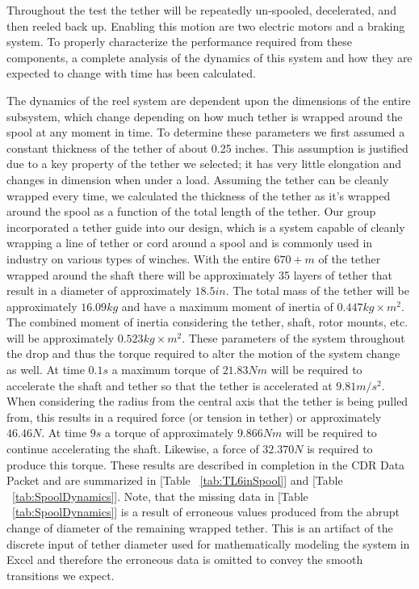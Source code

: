 \indent\indent Throughout the test the tether will be repeatedly un-spooled, decelerated, and then reeled back up. Enabling this motion are two electric motors and a braking system. To properly characterize the performance required from these components, a complete analysis of the dynamics of this system and how they are expected to change with time has been calculated. 

\indent\indent The dynamics of the reel system are dependent upon the dimensions of the entire subsystem, which change depending on how much tether is wrapped around the spool at any moment in time. To determine these parameters we first assumed a constant thickness of the tether of about 0.25 inches. This assumption is justified due to a key property of the tether we selected; it has very little elongation and changes in dimension when under a load. Assuming the tether can be cleanly wrapped every time, we calculated the thickness of the tether as it's wrapped around the spool as a function of the total length of the tether. Our group incorporated a tether guide into our design, which is a system capable of cleanly wrapping a line of tether or cord around a spool and is commonly used in industry on various types of winches. With the entire $670+ m$ of the tether wrapped around the shaft there will be approximately 35 layers of tether that result in a diameter of approximately $18.5 in$. The total mass of the tether will be approximately $16.09 kg$ and have a maximum moment of inertia of $0.447 kg\times m^2$. The combined moment of inertia considering the tether, shaft, rotor mounts, etc. will be approximately $0.523 kg\times m^2$. These parameters of the system throughout the drop and thus the torque required to alter the motion of the system change as well. At time $0.1 s$ a maximum torque of $21.83 Nm$ will be required to accelerate the shaft and tether so that the tether is accelerated at $9.81 m/s^2$. When considering the radius from the central axis that the tether is being pulled from, this results in a required force (or tension in tether) or approximately $46.46 N$. At time $9 s$ a torque of approximately $9.866 Nm$ will be required to continue accelerating the shaft. Likewise, a force of $32.370 N$ is required to produce this torque. These results are described in completion in the CDR Data Packet and are summarized in  [Table ~\ref{tab:TL6inSpool}] and [Table ~\ref{tab:SpoolDynamics}]. Note, that the missing data in [Table ~\ref{tab:SpoolDynamics}] is a result of erroneous values produced from the abrupt change of diameter of the remaining wrapped tether. This is an artifact of the discrete input of tether diameter used for mathematically modeling the system in Excel and therefore the erroneous data is omitted to convey the smooth transitions we expect. 


